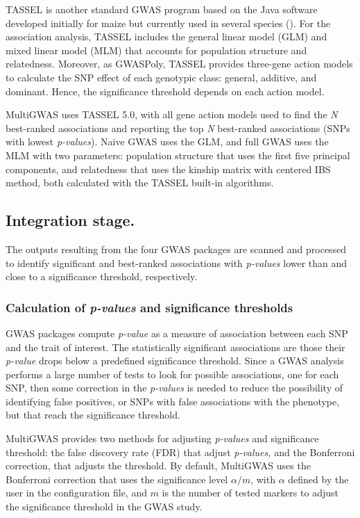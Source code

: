 \documentclass{article}
\begin{document}
TASSEL is another standard GWAS program based on the Java software developed initially for maize but currently used in several species (\cite{Alvarez2017, Zhang2018}). For the association analysis, TASSEL includes the general linear model (GLM) and mixed linear model (MLM) that accounts for population structure and relatedness. Moreover, as GWASPoly, TASSEL provides three-gene action models to calculate the SNP effect of each genotypic class: general, additive, and dominant. Hence, the significance threshold depends on each action model.

MultiGWAS uses TASSEL 5.0, with all gene action models used to find the \emph{N} best-ranked associations and reporting the top \emph{N} best-ranked associations (SNPs with lowest \emph{p-values}). Naive GWAS uses the GLM, and full GWAS uses the MLM with two parameters: population structure that uses the first five principal components, and relatedness that uses the kinship matrix with centered IBS method, both calculated with the TASSEL built-in algorithms. 


\subsection{Integration stage.}
The outputs resulting from the four GWAS packages are scanned and processed to identify significant and best-ranked associations with \emph{p-values} lower than and close to a significance threshold, respectively. 

\subsubsection{Calculation of \emph{p-values }and significance thresholds}

GWAS packages compute \emph{p-value }as a measure of association between each SNP and the trait of interest. The statistically significant associations are those their \emph{p-value }drops below a predefined significance threshold. Since a GWAS analysis performs a large number of tests to look for possible associations, one for each SNP, then some correction in the \emph{p-values} is needed to reduce the possibility of identifying false positives, or SNPs with false associations with the phenotype, but that reach the significance threshold.

MultiGWAS provides two methods for adjusting \emph{p-values} and significance threshold: the false discovery rate (FDR) that adjust \emph{p-values, }and the Bonferroni correction, that adjusts the threshold. By default, MultiGWAS uses the Bonferroni correction that uses the significance level $\alpha/m$, with $\alpha$ defined by the user in the configuration file, and $m$ is the number of tested markers to adjust the significance threshold in the GWAS study. 
\end{document}
